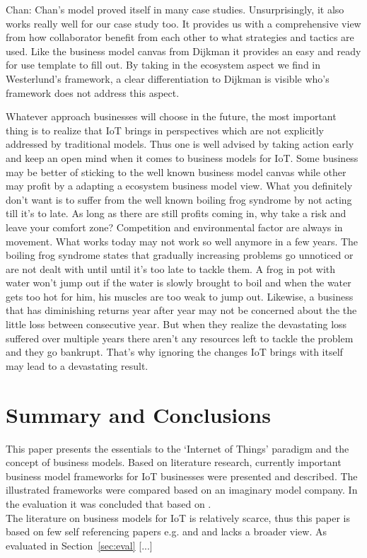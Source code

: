 	Chan: Chan's model proved itself in many case studies. Unsurprisingly, it also works really well for our case study too. It provides us with a comprehensive view from how collaborator benefit from each other to what strategies and tactics are used. Like the business model canvas from Dijkman it provides an easy and ready for use template to fill out. By taking in the ecosystem aspect we find in Westerlund's framework, a clear differentiation to Dijkman is visible who's framework does not address this aspect.

	Whatever approach businesses will choose in the future, the most important thing is to realize that IoT brings in perspectives which are not explicitly addressed by traditional models. Thus one is well advised by taking action early and keep an open mind when it comes to business models for IoT. Some business may be better of sticking to the well known business model canvas while other may profit by a adapting a ecosystem business model view. What you definitely don't want is to suffer from the well known boiling frog syndrome by not acting till it's to late. As long as there are still profits coming in, why take a risk and leave your comfort zone? Competition and environmental factor are always in movement. What works today may not work so well anymore in a few years. The boiling frog syndrome states that gradually increasing problems go unnoticed or are not dealt with until until it's too late to tackle them. A frog in pot with water won't jump out if the water is slowly brought to boil and when the water gets too hot for him, his muscles are too weak to jump out. Likewise, a business that has diminishing returns year after year may not be concerned about the the little loss between consecutive year. But when they realize the devastating loss suffered over multiple years there aren't any resources left to tackle the problem and they go bankrupt. That's why ignoring the changes IoT brings with itself may lead to a devastating result.

\section{Summary and Conclusions}
\label{sec:summary}
	
	This paper presents the essentials to the `Internet of Things' paradigm and the concept of business models. Based on literature research, currently important business model frameworks for IoT businesses were presented and described. The illustrated frameworks were compared based on an imaginary model company. In the evaluation it was concluded that \todo{[...]} based on \todo{[...]}.\\
	The literature on business models for IoT is relatively scarce, thus this paper is based on few self referencing papers e.g. \cite{ju} and \cite{dijkman} and lacks a broader view. As evaluated in Section~\ref{sec:eval} [...]\\


